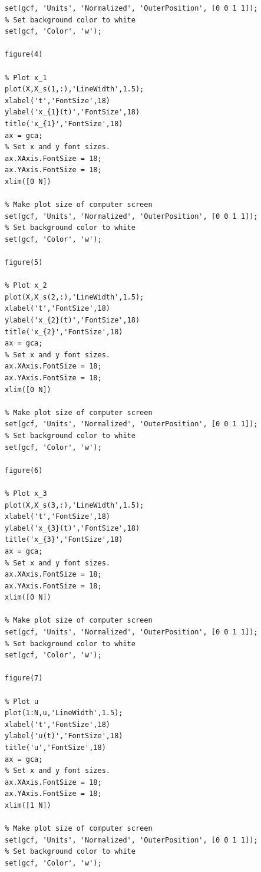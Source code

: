 \documentclass{article}
\begin{document}
\begin{enumerate}
\begin{enumerate}
\begin{lstlisting}[style=Matlab-editor]
% Make plot size of computer screen
set(gcf, 'Units', 'Normalized', 'OuterPosition', [0 0 1 1]);
% Set background color to white
set(gcf, 'Color', 'w');

figure(4)

% Plot x_1
plot(X,X_s(1,:),'LineWidth',1.5);
xlabel('t','FontSize',18)
ylabel('x_{1}(t)','FontSize',18)
title('x_{1}','FontSize',18)
ax = gca;
% Set x and y font sizes.
ax.XAxis.FontSize = 18;
ax.YAxis.FontSize = 18;
xlim([0 N])

% Make plot size of computer screen
set(gcf, 'Units', 'Normalized', 'OuterPosition', [0 0 1 1]);
% Set background color to white
set(gcf, 'Color', 'w');

figure(5)

% Plot x_2
plot(X,X_s(2,:),'LineWidth',1.5);
xlabel('t','FontSize',18)
ylabel('x_{2}(t)','FontSize',18)
title('x_{2}','FontSize',18)
ax = gca;
% Set x and y font sizes.
ax.XAxis.FontSize = 18;
ax.YAxis.FontSize = 18;
xlim([0 N])

% Make plot size of computer screen
set(gcf, 'Units', 'Normalized', 'OuterPosition', [0 0 1 1]);
% Set background color to white
set(gcf, 'Color', 'w');

figure(6)

% Plot x_3
plot(X,X_s(3,:),'LineWidth',1.5);
xlabel('t','FontSize',18)
ylabel('x_{3}(t)','FontSize',18)
title('x_{3}','FontSize',18)
ax = gca;
% Set x and y font sizes.
ax.XAxis.FontSize = 18;
ax.YAxis.FontSize = 18;
xlim([0 N])

% Make plot size of computer screen
set(gcf, 'Units', 'Normalized', 'OuterPosition', [0 0 1 1]);
% Set background color to white
set(gcf, 'Color', 'w');

figure(7)

% Plot u
plot(1:N,u,'LineWidth',1.5);
xlabel('t','FontSize',18)
ylabel('u(t)','FontSize',18)
title('u','FontSize',18)
ax = gca;
% Set x and y font sizes.
ax.XAxis.FontSize = 18;
ax.YAxis.FontSize = 18;
xlim([1 N])

% Make plot size of computer screen
set(gcf, 'Units', 'Normalized', 'OuterPosition', [0 0 1 1]);
% Set background color to white
set(gcf, 'Color', 'w');
\end{lstlisting}
            
            

\end{enumerate}
\end{enumerate}
\end{document}
